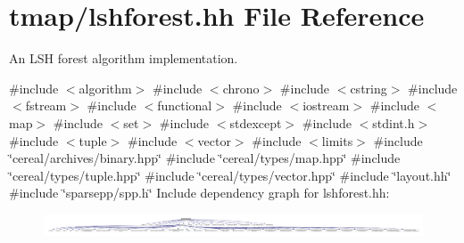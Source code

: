 \hypertarget{lshforest_8hh}{}\section{tmap/lshforest.hh File Reference}
\label{lshforest_8hh}


An L\+SH forest algorithm implementation.  


{\ttfamily \#include $<$algorithm$>$}\newline
{\ttfamily \#include $<$chrono$>$}\newline
{\ttfamily \#include $<$cstring$>$}\newline
{\ttfamily \#include $<$fstream$>$}\newline
{\ttfamily \#include $<$functional$>$}\newline
{\ttfamily \#include $<$iostream$>$}\newline
{\ttfamily \#include $<$map$>$}\newline
{\ttfamily \#include $<$set$>$}\newline
{\ttfamily \#include $<$stdexcept$>$}\newline
{\ttfamily \#include $<$stdint.\+h$>$}\newline
{\ttfamily \#include $<$tuple$>$}\newline
{\ttfamily \#include $<$vector$>$}\newline
{\ttfamily \#include $<$limits$>$}\newline
{\ttfamily \#include \char`\"{}cereal/archives/binary.\+hpp\char`\"{}}\newline
{\ttfamily \#include \char`\"{}cereal/types/map.\+hpp\char`\"{}}\newline
{\ttfamily \#include \char`\"{}cereal/types/tuple.\+hpp\char`\"{}}\newline
{\ttfamily \#include \char`\"{}cereal/types/vector.\+hpp\char`\"{}}\newline
{\ttfamily \#include \char`\"{}layout.\+hh\char`\"{}}\newline
{\ttfamily \#include \char`\"{}sparsepp/spp.\+h\char`\"{}}\newline
Include dependency graph for lshforest.\+hh\+:\nopagebreak
\begin{figure}[H]
\begin{center}
\leavevmode
\includegraphics[width=350pt]{lshforest_8hh__incl}
\end{center}
\end{figure}
